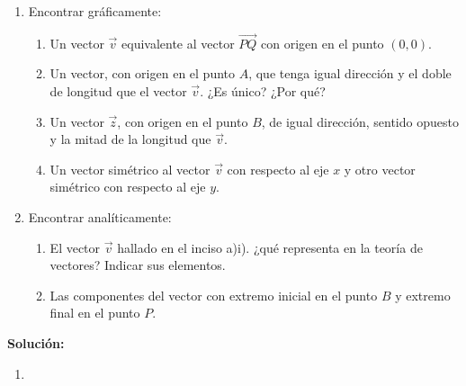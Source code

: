 \documentclass[11pt,a4paper]{article}
\begin{document}
\begin{enumerate}[\hspace{-5mm} 1) ]
\begin{center}
\vspace{-4mm}
\end{center}  

\begin{enumerate}
    \item Encontrar gráficamente:
   \begin{enumerate}[\hspace{-4mm} i)]
        \item Un vector $\vec{v}$ equivalente al vector $\overrightarrow{PQ}$ con origen en el punto $(0, 0)$.
        \item Un vector, con origen en el punto $A$, que tenga igual dirección y el doble de longitud que el vector $\vec{v}$. ¿Es único? ¿Por qué?
        \item Un vector $\vec{z}$, con origen en el punto $B$, de igual dirección, sentido opuesto y la mitad de la longitud que $\vec{v}$.
        \item Un vector simétrico al vector $\vec{v}$ con respecto al eje $x$ y otro vector simétrico con respecto al eje $y$.
    \end{enumerate}
\item  Encontrar analíticamente:
\begin{enumerate}[\hspace{-4mm} i)]
    \item  El vector $\vec{v}$ hallado en el inciso a)i). ¿qué representa en la teoría de vectores? Indicar sus elementos.
    \item  Las componentes del vector con extremo inicial en el punto $B$ y extremo final en el punto $P$.
\end{enumerate}
\end{enumerate}


{\bf Solución:}


\begin{enumerate}
    \item \begin{enumerate}[i)]
    \end{enumerate}

\begin{center}


 

\end{center}
\end{enumerate}
\end{enumerate}
\end{document}
